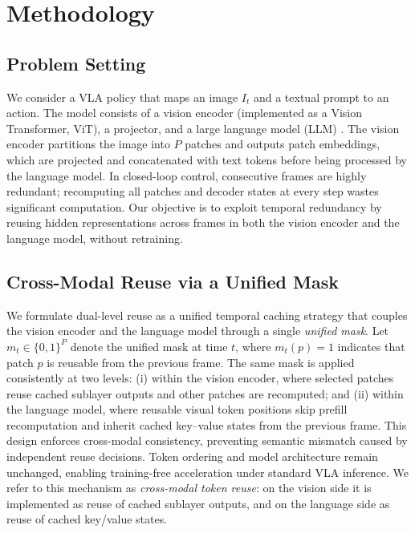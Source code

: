 \documentclass[11pt]{article}
\begin{document}
\section{Methodology}
\subsection{Problem Setting}
We consider a VLA policy that maps an image $I_t$ and a textual prompt to an action. The model consists of a vision encoder (implemented as a Vision Transformer, ViT), a projector, and a large language model (LLM) \citep{vaswani2017attention,touvron2023llama,bai2023qwen,team2024gemma}. The vision encoder partitions the image into $P$ patches and outputs patch embeddings, which are projected and concatenated with text tokens before being processed by the language model. In closed-loop control, consecutive frames are highly redundant; recomputing all patches and decoder states at every step wastes significant computation. Our objective is to exploit temporal redundancy by reusing hidden representations across frames in both the vision encoder and the language model, without retraining.


\subsection{Cross-Modal Reuse via a Unified Mask}
We formulate dual-level reuse as a unified temporal caching strategy that couples the vision encoder and the language model through a single \emph{unified mask}. Let $m_t \in \{0,1\}^P$ denote the unified mask at time $t$, where $m_t(p)=1$ indicates that patch $p$ is reusable from the previous frame. The same mask is applied consistently at two levels: (i) within the vision encoder, where selected patches reuse cached sublayer outputs and other patches are recomputed; and (ii) within the language model, where reusable visual token positions skip prefill recomputation and inherit cached key--value states from the previous frame. This design enforces cross-modal consistency, preventing semantic mismatch caused by independent reuse decisions. Token ordering and model architecture remain unchanged, enabling training-free acceleration under standard VLA inference.
We refer to this mechanism as \emph{cross-modal token reuse}: on the vision side it is implemented as reuse of cached sublayer outputs, and on the language side as reuse of cached key/value states.
\end{document}
